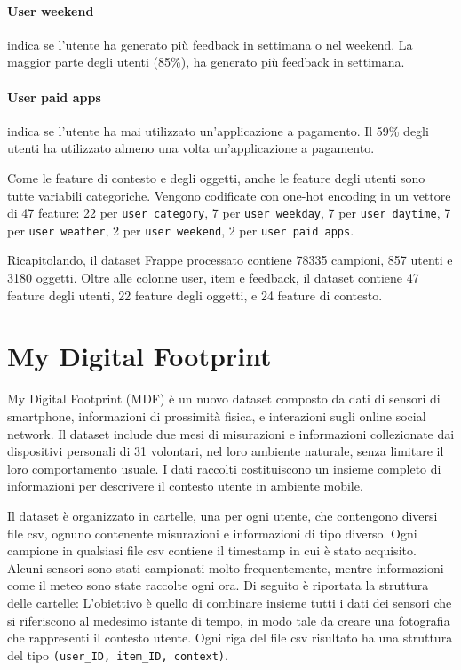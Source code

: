 \documentclass[12pt,italian]{report}
\begin{document}
\paragraph{User weekend} indica se l'utente ha generato più feedback in settimana o nel weekend. La maggior parte degli utenti (85\%), ha generato più feedback in settimana.

\paragraph{User paid apps} indica se l'utente ha mai utilizzato un'applicazione a pagamento. Il 59\% degli utenti ha utilizzato almeno una volta un'applicazione a pagamento.

\bigskip \noindent
Come le feature di contesto e degli oggetti, anche le feature degli utenti sono tutte variabili categoriche. Vengono codificate con one-hot encoding in un vettore di 47 feature: 22 per \texttt{user category}, 7 per \texttt{user weekday}, 7 per \texttt{user daytime}, 7 per \texttt{user weather}, 2 per \texttt{user weekend}, 2 per \texttt{user paid apps}.

Ricapitolando, il dataset Frappe processato contiene 78335 campioni, 857 utenti e 3180 oggetti. Oltre alle colonne user, item e feedback, il dataset contiene 47 feature degli utenti, 22 feature degli oggetti, e 24 feature di contesto.

\section{My Digital Footprint}
My Digital Footprint (MDF) \cite{mdf} è un nuovo dataset composto da dati di sensori di smartphone, informazioni di prossimità fisica, e interazioni sugli online social network. Il dataset include due mesi di misurazioni e informazioni collezionate dai dispositivi personali di 31 volontari, nel loro ambiente naturale, senza limitare il loro comportamento usuale. I dati raccolti costituiscono un insieme completo di informazioni per descrivere il contesto utente in ambiente mobile. 

Il dataset è organizzato in cartelle, una per ogni utente, che contengono diversi file csv, ognuno contenente misurazioni e informazioni di tipo diverso. Ogni campione in qualsiasi file csv contiene il timestamp in cui è stato acquisito. Alcuni sensori sono stati campionati molto frequentemente, mentre informazioni come il meteo sono state raccolte ogni ora.
Di seguito è riportata la struttura delle cartelle:
\noindent
L'obiettivo è quello di combinare insieme tutti i dati dei sensori che si riferiscono al medesimo istante di tempo, in modo tale da creare una fotografia che rappresenti il contesto utente. Ogni riga del file csv risultato ha una struttura del tipo \texttt{(user\_ID, item\_ID, context)}.
\end{document}
